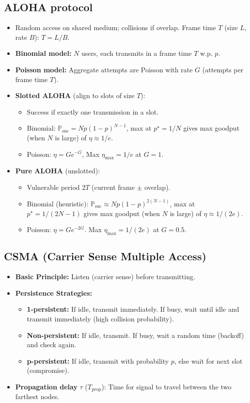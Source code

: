 \subsection{ALOHA protocol}
\begin{itemize}
	\item Random access on shared medium; collisions if overlap. Frame time $T$ (size $L$, rate $B$): $T=L/B$.
    \item \textbf{Binomial model:} $N$ users, each transmits in a frame time $T$ w.p. $p$.
    \item \textbf{Poisson model:} Aggregate attempts are Poisson with rate $G$ (attempts per frame time $T$).
    \item \textbf{Slotted ALOHA} (align to slots of size $T$):
	\begin{itemize}
		\item Success if exactly one transmission in a slot.
        \item Binomial: $\mathbb{P}_{\text{suc}}=Np(1-p)^{N-1}$, max at $p^\star=1/N$ gives max goodput (when $N$ is large) of $\eta\approx 1/e$.
        \item Poisson: $\eta=Ge^{-G}$, Max $\eta_{\max}=1/e$ at $G=1$.
	\end{itemize}
	\item \textbf{Pure ALOHA} (unslotted):
	\begin{itemize}
		\item Vulnerable period $2T$ (current frame $\pm$ overlap).
        \item Binomial (heuristic): $\mathbb{P}_{\text{suc}} \approx Np(1-p)^{2(N-1)}$, max at $p^\star=1/(2N-1)$ gives max goodput (when $N$ is large) of $\eta\approx 1/(2e)$.
        \item Poisson: $\eta=Ge^{-2G}$. Max $\eta_{\max}=1/(2e)$ at $G=0.5$.
	\end{itemize}
\end{itemize}

\subsection{CSMA (Carrier Sense Multiple Access)}
\begin{itemize}
    \item \textbf{Basic Principle:} Listen (carrier sense) before transmitting.
    \item \textbf{Persistence Strategies:}
    \begin{itemize}
        \item \textbf{1-persistent:} If idle, transmit immediately. If busy, wait until idle and transmit immediately (high collision probability).
        \item \textbf{Non-persistent:} If idle, transmit. If busy, wait a random time (backoff) and check again.
        \item \textbf{p-persistent:} If idle, transmit with probability $p$, else wait for next slot (compromise).
    \end{itemize}
    \item \textbf{Propagation delay} $\tau$ ($T_{\text{prop}}$): Time for signal to travel between the two farthest nodes.
\end{itemize}

